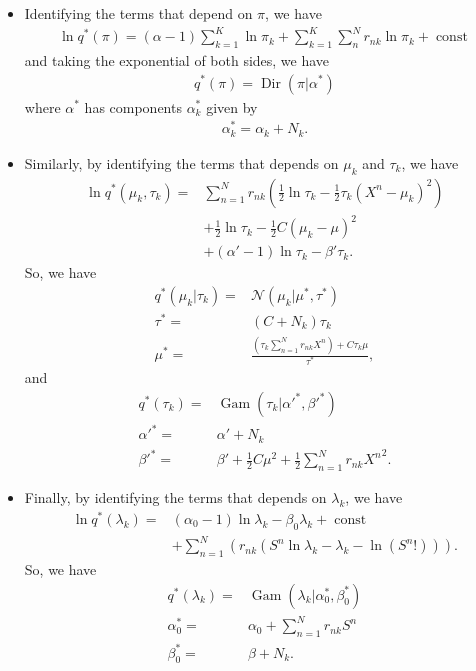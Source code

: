 \documentclass[11pt]{extarticle}
\newcommand{\N}{\mathcal{N}}
\newcommand{\0}{\mathbf{0}}
\renewcommand{\(}{\left(}
\renewcommand{\)}{\right)}
\DeclareMathOperator{\const}{const}
\DeclareMathOperator{\Dir}{Dir}
\DeclareMathOperator{\Gam}{Gam}
\theoremstyle{definition}
\begin{document}
\begin{itemize}
\item Identifying the terms that depend on $\pi$, we have
\begin{align*}
	\ln q^{*}(\pi) = (\alpha - 1) \sum_{k=1}^{K}\ln \pi_{k} + \sum_{k=1}^{K}\sum_{n}^{N}r_{nk}\ln \pi_{k} + \const
\end{align*}
and taking the exponential of both sides, we have
\begin{align*}
	q^{*}(\pi) = \Dir(\pi \vert \alpha^{*})
\end{align*}
where $\alpha^{*}$ has components $\alpha^{*}_{k}$ given by
\begin{align*}
	\alpha^{*}_{k} = \alpha_{k} + N_{k}.
\end{align*}

\item Similarly, by identifying the terms that depends on $\mu_{k}$ and $\tau_{k}$, we have
\begin{align*}
	\ln q^{*}(\mu_{k}, \tau_{k}) =& \sum_{n=1}^{N}r_{nk}\left(\frac{1}{2}\ln\tau_{k}-\frac{1}{2}\tau_{k}\left(X^{n}-\mu_{k}\right)^{2}\right) \\ & + \frac{1}{2}\ln\tau_{k} - \frac{1}{2}C(\mu_{k} - \mu)^{2} \\ & + (\alpha'-1)\ln\tau_{k} - \beta'\tau_{k}.
\end{align*}
So, we have
\begin{align*}
	q^{*}(\mu_{k} \vert \tau_{k}) =& \N(\mu_{k} \vert \mu^{*}, \tau^{*}) \\
	\tau^{*} =& (C + N_{k})\tau_{k} \\
	\mu^{*} =& \frac{\left(\tau_{k} \sum_{n=1}^{N} r_{nk}X^{n}\right) + C\tau_{k}\mu}{\tau^{*}},
\end{align*}
and
\begin{align*}
	q^{*}(\tau_{k}) =& \Gam(\tau_{k} \vert \alpha'^{*}, \beta'^{*}) \\
	\alpha'^{*} =& \alpha' + N_{k} \\
	\beta'^{*} =& \beta' + \frac{1}{2}C\mu^{2} + \frac{1}{2}\sum_{n=1}^{N}r_{nk}{X^{n}}^{2}.
\end{align*}

\item Finally, by identifying the terms that depends on $\lambda_{k}$, we have
\begin{align*}
	\ln q^{*}(\lambda_{k}) =& (\alpha_{0}-1)\ln\lambda_{k} - \beta_{0}\lambda_{k} + \const \\ & + \sum_{n=1}^{N}\left(r_{nk}\left(S^{n}\ln\lambda_{k} - \lambda_{k} - \ln \left(S^{n}!\right)\right)\right).
\end{align*}
So, we have
\begin{align*}
	q^{*}(\lambda_{k}) =& \Gam(\lambda_{k} \vert \alpha_{0}^{*}, \beta_{0}^{*}) \\
	\alpha_{0}^{*} =& \alpha_{0} + \sum_{n=1}^{N} r_{nk}S^{n} \\
	\beta_{0}^{*} =& \beta + N_{k}.
\end{align*}
\end{itemize}
\end{document}
